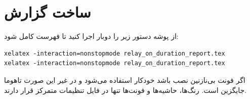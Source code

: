 
\section{ساخت گزارش}
از پوشه
دستور زیر را دوبار اجرا کنید تا فهرست کامل شود:
\begin{LTR}
\begin{verbatim}
xelatex -interaction=nonstopmode relay_on_duration_report.tex
xelatex -interaction=nonstopmode relay_on_duration_report.tex
\end{verbatim}
\end{LTR}
اگر فونت بی‌نازنین نصب باشد خودکار استفاده می‌شود و در غیر این صورت تاهوما جایگزین است. رنگ‌ها، حاشیه‌ها و فونت‌ها تنها در فایل تنظیمات متمرکز قرار دارند.
